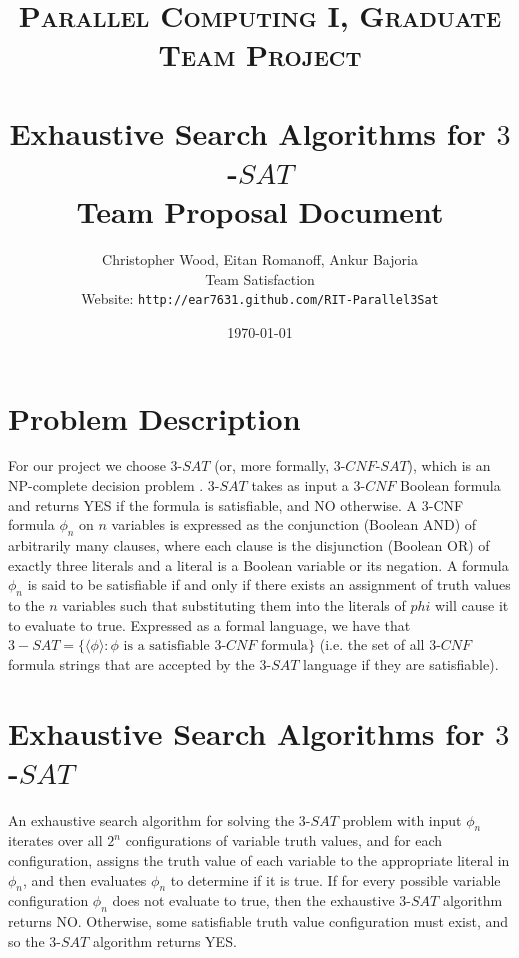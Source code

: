 \documentclass[paper=a4, fontsize=11pt]{scrartcl} %
\title{	
\normalfont \normalsize 
\textsc{Parallel Computing I, Graduate Team Project} \\ %
\horrule{2pt} \\[0.4cm] %
\vspace{-1.5em}
\huge Exhaustive Search Algorithms for $3$-$SAT$ \\ 
\Large Team Proposal Document \\
\vspace{-0.5em}
\horrule{2pt}
}
\author{Christopher Wood, Eitan Romanoff, Ankur Bajoria \\
Team Satisfaction\\
Website: {\tt http://ear7631.github.com/RIT-Parallel3Sat} } %
\date{\large \today} %
\begin{document}
\maketitle %

\vspace{-2em}
\section{Problem Description}
For our project we choose $3$-$SAT$ (or, more formally, $3$-$CNF$-$SAT$), which 
is an NP-complete decision problem \cite{algs}. $3$-$SAT$ takes as input 
a $3$-$CNF$ Boolean formula and returns YES if the formula is 
satisfiable, and NO otherwise. A 3-CNF formula $\phi_n$ on $n$ variables
is expressed as the conjunction (Boolean AND) of arbitrarily many clauses, 
where each clause is the disjunction (Boolean OR) of exactly three literals and a 
literal is a Boolean variable or its negation. A formula $\phi_n$ 
is said to be satisfiable if and only if there exists an 
assignment of truth values to the $n$ variables such that substituting them 
into the literals of $phi$ will cause it to evaluate to true. 
Expressed as a formal language, we have that 
$3-SAT = \{\langle \phi \rangle : \phi \text{ is a satisfiable }3\text{-}CNF\text{ formula} \}$
(i.e. the set of all $3$-$CNF$ formula strings that are accepted by the 
$3$-$SAT$ language if they are satisfiable).

\section{Exhaustive Search Algorithms for $3$-$SAT$}
An exhaustive search algorithm for solving the $3$-$SAT$ 
problem with input $\phi_n$ iterates over 
all $2^n$ configurations of variable truth values, and for each 
configuration, assigns the truth value of each variable 
to the appropriate literal in $\phi_n$, and then evaluates $\phi_n$ to determine if it is true. If for 
every possible variable configuration $\phi_n$ does not evaluate to 
true, then the exhaustive $3$-$SAT$ algorithm returns NO. Otherwise, 
some satisfiable truth value configuration must exist, and so the $3$-$SAT$ algorithm 
returns YES. 
\end{document}
